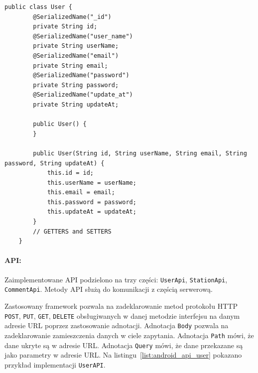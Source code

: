 
\begin{lstlisting}[label=list:user_class,caption=Plik \texttt{main/java/com/example/testapp/api/api/UserApi.java}.,basicstyle=\tiny\ttfamily]
    public class User {
        @SerializedName("_id")
        private String id;
        @SerializedName("user_name")
        private String userName;
        @SerializedName("email")
        private String email;
        @SerializedName("password")
        private String password;
        @SerializedName("update_at")
        private String updateAt;
    
        public User() {
        }
    
        public User(String id, String userName, String email, String password, String updateAt) {
            this.id = id;
            this.userName = userName;
            this.email = email;
            this.password = password;
            this.updateAt = updateAt;
        }
        // GETTERS and SETTERS
    }
\end{lstlisting}

\paragraph{API:} 
Zaimplementowane API podzielono na trzy części: \texttt{UserApi}, %
\texttt{StationApi}, %
\texttt{CommentApi}. %
Metody API służą do komunikacji z częścią serwerową.

Zastosowany framework pozwala na zadeklarowanie metod protokołu HTTP  \texttt{POST}, \texttt{PUT}, \texttt{GET}, \texttt{DELETE} obsługiwanych w danej metodzie interfejsu na danym adresie URL poprzez zastosowanie adnotacji. Adnotacja \texttt{Body} pozwala na zadeklarowanie zamieszczenia danych w ciele zapytania. Adnotacja \texttt{Path} mówi, że dane ukryte są w adresie URL. Adnotacja \texttt{Query} mówi, że dane przekazane są jako parametry w adresie URL. Na listingu~\ref{list:android_api_user} pokazano przykład implementacji \texttt{UserAPI}.

